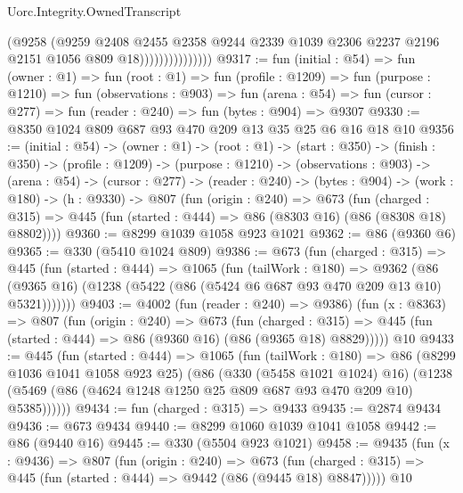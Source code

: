 \begin{lexlean}{Uorc.Integrity.OwnedTranscript}
\begin{coremodule}
                              (@9258
                                (@9259
                                  @2408
                                  @2455
                                  @2358
                                  @9244
                                  @2339
                                  @1039
                                  @2306
                                  @2237
                                  @2196
                                  @2151
                                  @1056
                                  @809
                                  @18)))))))))))))))
@9317 := fun (initial : @54) =>
  fun (owner : @1) =>
  fun (root : @1) =>
  fun (profile : @1209) =>
  fun (purpose : @1210) =>
  fun (observations : @903) =>
  fun (arena : @54) => fun (cursor : @277) => fun (reader : @240) => fun (bytes : @904) => @9307
@9330 := @8350 @1024 @809 @687 @93 @470 @209 @13 @35 @25 @6 @16 @18 @10
@9356 := (initial : @54) ->
  (owner : @1) ->
  (root : @1) ->
  (start : @350) ->
  (finish : @350) ->
  (profile : @1209) ->
  (purpose : @1210) ->
  (observations : @903) ->
  (arena : @54) ->
  (cursor : @277) ->
  (reader : @240) ->
  (bytes : @904) ->
  (work : @180) ->
  (h : @9330) ->
  @807
    (fun (origin : @240) =>
    @673
      (fun (charged : @315) =>
      @445 (fun (started : @444) => @86 (@8303 @16) (@86 (@8308 @18) @8802))))
@9360 := @8299 @1039 @1058 @923 @1021
@9362 := @86 (@9360 @6)
@9365 := @330 (@5410 @1024 @809)
@9386 := @673
    (fun (charged : @315) =>
    @445
      (fun (started : @444) =>
      @1065
        (fun (tailWork : @180) =>
        @9362 (@86 (@9365 @16) (@1238 (@5422 (@86 (@5424 @6 @687 @93 @470 @209 @13 @10) @5321)))))))
@9403 := @4002
    (fun (reader : @240) => @9386)
    (fun (x : @8363) =>
    @807
      (fun (origin : @240) =>
      @673
        (fun (charged : @315) =>
        @445 (fun (started : @444) => @86 (@9360 @16) (@86 (@9365 @18) @8829)))))
    @10
@9433 := @445
    (fun (started : @444) =>
    @1065
      (fun (tailWork : @180) =>
      @86
        (@8299 @1036 @1041 @1058 @923 @25)
        (@86
          (@330 (@5458 @1021 @1024) @16)
          (@1238 (@5469 (@86 (@4624 @1248 @1250 @25 @809 @687 @93 @470 @209 @10) @5385))))))
@9434 := fun (charged : @315) => @9433
@9435 := @2874 @9434
@9436 := @673 @9434
@9440 := @8299 @1060 @1039 @1041 @1058
@9442 := @86 (@9440 @16)
@9445 := @330 (@5504 @923 @1021)
@9458 := @9435
    (fun (x : @9436) =>
    @807
      (fun (origin : @240) =>
      @673 (fun (charged : @315) => @445 (fun (started : @444) => @9442 (@86 (@9445 @18) @8847)))))
    @10

\end{coremodule}
\end{lexlean}
